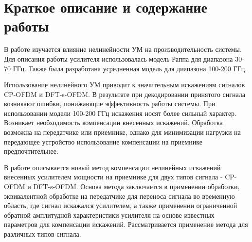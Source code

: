 \documentclass{unn}
\begin{document}
\section{Краткое описание и содержание работы}
В работе изучается влияние нелинейности УМ на производительность
системы. Для описания работы усилителя использовалась модель Раппа для
диапазона 30-70 ГГц. Также была разработана усредненная модель для
диапазона 100-200 ГГц. 

Использование нелинейного УМ приводит к значительным искажениям сигналов
CP-OFDM и DFT-s-OFDM. В результате при декодировании принятого сигнала
возникают ошибки, понижающие эффективность работы системы. При
использовании модели 100-200 ГГц искажения носят более сильный характер.
Возникает необходимость компенсации внесенных искажений. Обработка возможна
на передатчике или приемнике, однако для минимизации нагрузки на передающее
устройство использование компенсации на приемнике предпочтительнее.

В работе описывается новый метод компенсации нелинейных искажений внесенных
усилителем мощности на приемнике для двух типов сигнала - CP-OFDM и
DFT-s-OFDM. Основа метода заключается в применении обработки, эквивалентной
обработке на передатчике для переноса сигнала во временную область, где
сигнал искажался усилителем, а также применении ограниченной обратной
амплитудной характеристики усилителя на основе известных параметров для
компенсации искажений. Рассматривается применение метода для различных
типов сигнала.
\end{document}
